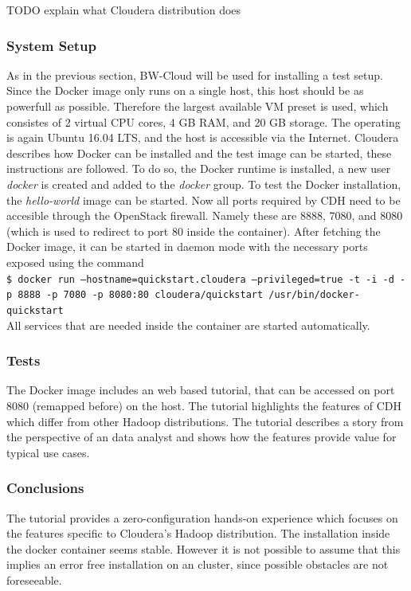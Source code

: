 TODO explain what Cloudera distribution does


\subsubsection{System Setup}

As in the previous section, BW-Cloud will be used for installing a test setup.
Since the Docker image only runs on a single host, this host should be as powerfull as possible.
Therefore the largest available \ac{VM} preset is used, which consistes of 2 virtual \ac{CPU} cores, 
4 \ac{GB} \ac{RAM}, and 20 \ac{GB} storage. The operating is again Ubuntu 16.04 \ac{LTS}, 
and the host is accessible via the Internet. 
Cloudera describes how Docker can be installed and the test image can be started, 
these instructions are followed. \autocite[][]{cloudera2018docker}
To do so, the Docker runtime is installed, a new  user \emph{docker} is created and added to the \emph{docker} group. To test the Docker installation, the \emph{hello-world} image can be started.
Now all ports required by \ac{CDH} need to be accesible through the OpenStack firewall.
Namely these are 8888, 7080, and 8080 (which is used to redirect to port 80 inside the container).
After fetching the Docker  image, it can be started in daemon mode with the necessary ports exposed using the command\\
\texttt{\$ docker run --hostname=quickstart.cloudera --privileged=true -t -i -d -p 8888 -p 7080 -p 8080:80 cloudera/quickstart /usr/bin/docker-quickstart}\\
All services that are needed inside the container are started automatically.


\subsubsection{Tests}
The Docker image includes an web based tutorial, 
that can be accessed on port 8080 (remapped before) on the host.
The tutorial highlights the features of \ac{CDH} which differ from other Hadoop distributions.
The tutorial describes a story from the perspective of an data analyst and shows how the features provide value for typical use cases.

\subsubsection{Conclusions}
The tutorial provides a zero-configuration hands-on experience which focuses on the features specific to Cloudera's Hadoop distribution.
The installation inside the docker container seems stable.
However it is not possible to assume that this implies an error free installation on an cluster, 
since possible obstacles are not foreseeable.

